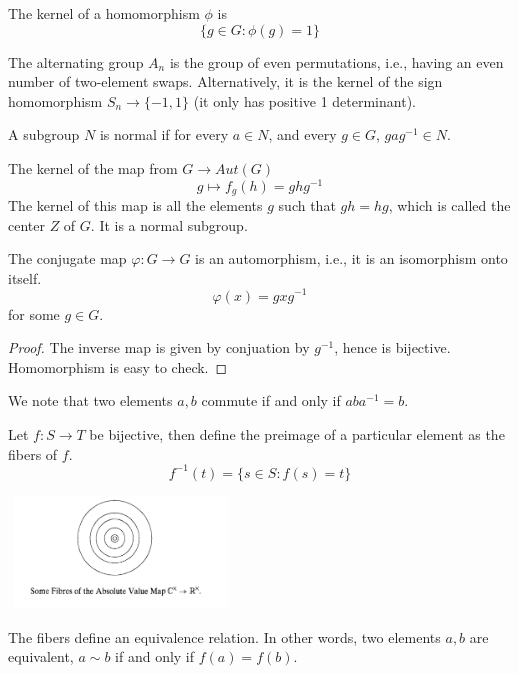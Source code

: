 \begin{defn}
    The kernel of a homomorphism $\phi$ is 
    \begin{equation*}
        \{g\in G: \phi(g)=1\}
    \end{equation*}
\end{defn}
\begin{defn}
    The alternating group $A_n$ is the group of even permutations, i.e., having an even number of two-element swaps. Alternatively, it is the kernel of the sign homomorphism $S_n\to \{-1, 1\}$ (it only has positive 1 determinant).
\end{defn}

\begin{defn}
    A subgroup $N$ is normal if for every $a\in N$, and every $g\in G$, $gag^{-1}\in N$.
\end{defn}

\begin{prop}
    The kernel of the map from $G\to Aut(G)$
    \begin{equation*}
        g\mapsto f_g(h)=ghg^{-1}
    \end{equation*}
    The kernel of this map is all the elements $g$ such that $gh=hg$, which is called the center $Z$ of $G$. It is a normal subgroup.
\end{prop}


\begin{prop}
    The conjugate map $\varphi:G\to G$ is an automorphism, i.e., it is an isomorphism onto itself. 
    \begin{equation*}
        \varphi(x)=gxg^{-1}
    \end{equation*}
    for some $g\in G$.
\end{prop}
\begin{proof}
    The inverse map is given by conjuation by $g^{-1}$, hence is bijective. Homomorphism is easy to check.
\end{proof}
We note that two elements $a,b$ commute if and only if $aba^{-1}=b$.



\begin{defn}[fibers]
    Let $f:S\to T$ be bijective, then define the preimage of a particular element as the fibers of $f$.
    \begin{equation*}
        f^{-1}(t)=\{s\in S: f(s)=t\}
    \end{equation*}
\end{defn}
\begin{center}
    \includegraphics[width=6cm, height=3cm]{fiber.png}
\end{center}
The fibers define an equivalence relation. In other words, two elements $a, b$ are equivalent, $a\sim b$ if and only if $f(a)=f(b)$.

